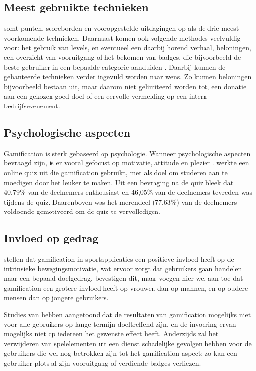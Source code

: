 \subsection{Meest gebruikte technieken}
\textcite{Hamari2014} somt punten, scoreborden en vooropgestelde uitdagingen op als de drie meest voorkomende technieken. Daarnaast komen ook volgende methodes veelvuldig voor: het gebruik van levels, en eventueel een daarbij horend verhaal, beloningen, een overzicht van vooruitgang of het bekomen van badges, die bijvoorbeeld de beste gebruiker in een bepaalde categorie aanduiden \autocite{Dong2012,Flatla2011,Li2012}.
Daarbij kunnen de gehanteerde technieken verder ingevuld worden naar wens. Zo kunnen beloningen bijvoorbeeld bestaan uit, maar daarom niet gelimiteerd worden tot, een donatie aan een gekozen goed doel of een eervolle vermelding op een intern bedrijfsevenement.

\subsection{Psychologische aspecten}
Gamification is sterk gebaseerd op psychologie. Wanneer psychologische aspecten bevraagd zijn, is er vooral gefocust op motivatie, attitude en plezier \autocite{Hamari2014}. \textcite{Cheong2013} werkte een online quiz uit die gamification gebruikt, met als doel om studeren aan te moedigen door het leuker te maken. Uit een bevraging  na de quiz bleek dat 40,79\% van de deelnemers enthousiast en 46,05\% van de deelnemers tevreden was tijdens de quiz. Daarenboven was het merendeel (77,63\%) van de deelnemers voldoende gemotiveerd om de quiz te vervolledigen.

\subsection{Invloed op gedrag}
\textcite{Kari2016} stellen dat gamification in sportapplicaties een positieve invloed heeft op de intrinsieke bewegingsmotivatie, wat ervoor zorgt dat gebruikers gaan handelen naar een bepaald doelgedrag. \textcite{PoloPena2020} bevestigen dit, maar voegen hier wel aan toe dat gamification een grotere invloed heeft op vrouwen dan op mannen, en op oudere mensen dan op jongere gebruikers. %

Studies van \textcite{Hamari2013a} hebben aangetoond dat de resultaten van gamification mogelijks niet voor alle gebruikers op lange termijn doeltreffend zijn, en de invoering ervan mogelijks niet op iedereen het gewenste effect heeft.
Anderzijds zal het verwijderen van spelelementen uit een dienst schadelijke gevolgen hebben voor de gebruikers die wel nog betrokken zijn tot het gamification-aspect: zo kan een gebruiker plots al zijn vooruitgang of verdiende badges verliezen.

